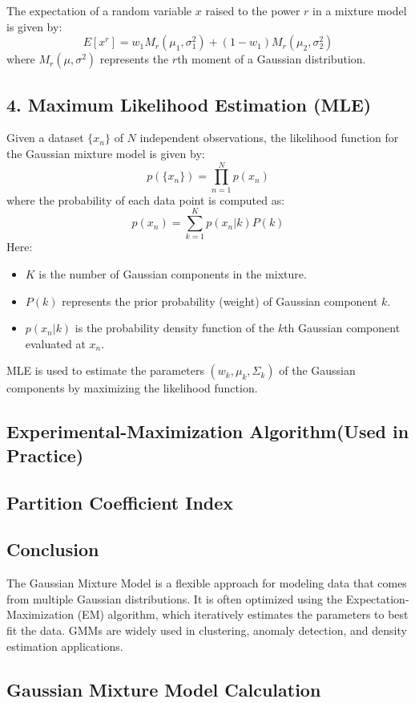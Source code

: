 \documentclass{article}
\begin{document}
The expectation of a random variable \(x\) raised to the power \(r\) in a mixture model is given by:
\[
E[x^r] = w_1M_r(\mu_1,\sigma_1^2) + (1 - w_1)M_r(\mu_2,\sigma_2^2)
\]
where \(M_r(\mu, \sigma^2)\) represents the \(r\)th moment of a Gaussian distribution.

\subsection*{4. Maximum Likelihood Estimation (MLE)}
Given a dataset \( \{x_n\} \) of \(N\) independent observations, the likelihood function for the Gaussian mixture model is given by:
\[
p(\{x_n\}) = \prod_{n=1}^{N} p(x_n)
\]
where the probability of each data point is computed as:
\[
p(x_n) = \sum_{k=1}^{K} p(x_n|k) P(k)
\]
Here:
\begin{itemize}
    \item \(K\) is the number of Gaussian components in the mixture.
    \item \(P(k)\) represents the prior probability (weight) of Gaussian component \(k\).
    \item \(p(x_n|k)\) is the probability density function of the \(k\)th Gaussian component evaluated at \(x_n\).
\end{itemize}
MLE is used to estimate the parameters \((w_k, \mu_k, \Sigma_k)\) of the Gaussian components by maximizing the likelihood function.

\subsection*{Experimental-Maximization Algorithm(Used in Practice)}
\subsection*{Partition Coefficient Index}
\subsection*{Conclusion}
The Gaussian Mixture Model is a flexible approach for modeling data that comes from multiple Gaussian distributions. It is often optimized using the Expectation-Maximization (EM) algorithm, which iteratively estimates the parameters to best fit the data. GMMs are widely used in clustering, anomaly detection, and density estimation applications.

\subsection*{Gaussian Mixture Model Calculation}
\end{document}

